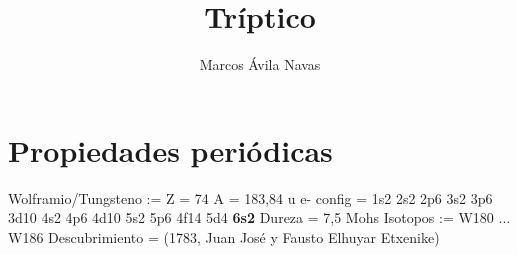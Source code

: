 \documentclass{article}
\title{Tríptico}
\author{Marcos Ávila Navas}
\date{\date{}}
\begin{document}
\maketitle

\section{Propiedades periódicas}

Wolframio/Tungsteno := 
    Z = 74
    A = 183,84 u 
    e- config = 1s2 2s2 2p6 3s2 3p6 3d10 4s2 4p6 4d10 5s2 5p6 4f14 5d4 \textbf{6s2}
    Dureza = 7,5 Mohs
    Isotopos := W180 ... W186
    Descubrimiento = (1783, Juan José y Fausto Elhuyar Etxenike)

    

\end{document}
